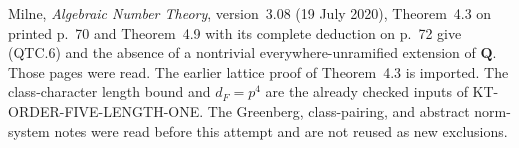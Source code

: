 Milne, \emph{Algebraic Number Theory}, version~3.08
(19 July 2020), Theorem~4.3 on printed p.~70 and Theorem~4.9
with its complete deduction on p.~72 give (QTC.6) and the absence
of a nontrivial everywhere-unramified extension of $\mathbf Q$.
Those pages were read.  The earlier lattice proof of Theorem~4.3
is imported.  The class-character length bound and $d_F=p^4$
are the already checked inputs of KT-ORDER-FIVE-LENGTH-ONE.
The Greenberg, class-pairing, and abstract norm-system notes were
read before this attempt and are not reused as new exclusions.
